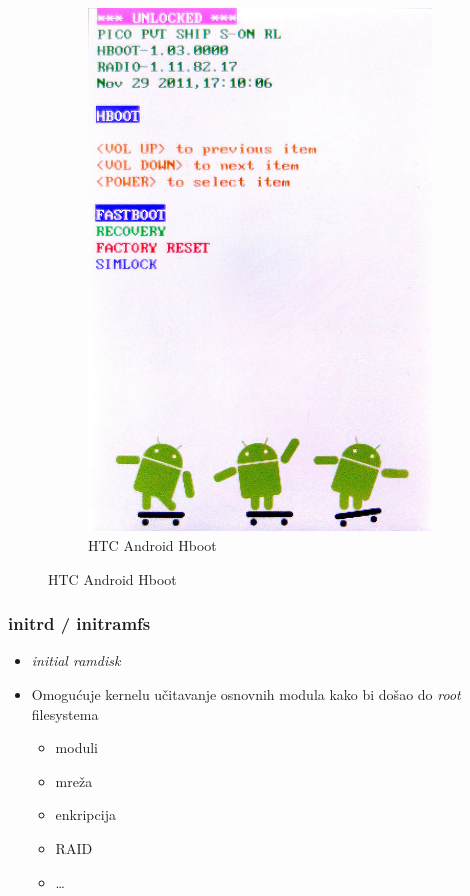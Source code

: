 \documentclass[t]{beamer}
\begin{document}
\begin{frame}
\begin{figure}
\begin{subfigure}[f]{0.3\textwidth}
			\includegraphics[width=\textwidth]{androidHboot.jpg}
			\caption*{HTC Android Hboot}
		\end{subfigure}
	\end{figure}
\end{frame}

\begin{frame}
	\frametitle{initrd / initramfs}
	\begin{itemize}
		\item \emph{initial ramdisk}
		\item Omogućuje kernelu učitavanje osnovnih modula kako bi došao do \emph{root} filesystema
		\begin{itemize}
			\item moduli
			\item mreža
			\item enkripcija
			\item RAID
			\item \dots
		\end{itemize}
	\end{itemize}
\end{frame}
\end{document}
